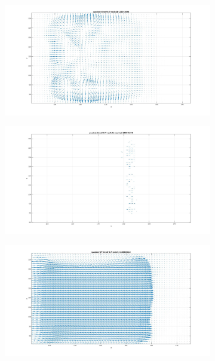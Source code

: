 \begin{figure}[tb]
\centering
\begin{subfigure}{.45\textwidth}
  \centering
  \includegraphics[height=.6\linewidth]{figs/quadrat_close.jpg}
  \caption{}
  \label{fig:qaudrat-close-masking-1}
\end{subfigure}
\begin{subfigure}{.45\textwidth}
  \centering
  \includegraphics[height=.6\linewidth]{figs/quadrat_close_mask.jpg}
  \caption{}
  \label{fig:qaudrat-close-masking-2}
\end{subfigure}
\begin{subfigure}{.45\textwidth}
  \centering
  \includegraphics[height=.6\linewidth]{figs/quadrat_close_GT.jpg}

\end{subfigure}
\end{figure}
